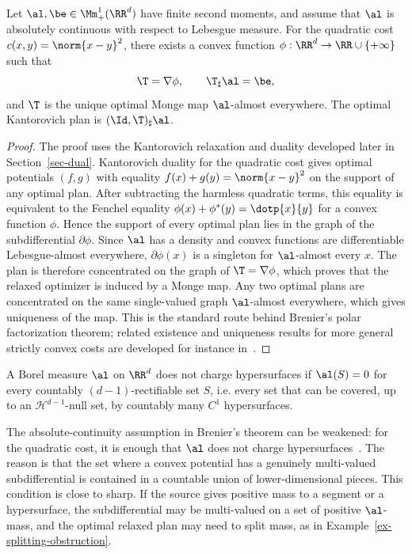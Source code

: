 \begin{thm}[Brenier]\label{thm-brenier}
	Let $\al,\be\in\Mm_+^1(\RR^d)$ have finite second moments, and assume that $\al$ is absolutely continuous with respect to Lebesgue measure. For the quadratic cost $c(x,y)=\norm{x-y}^2$, there exists a convex function $\phi:\RR^d\to\RR\cup\{+\infty\}$ such that
	\[
		\T=\nabla\phi,
		\qquad
		\T_\sharp\al=\be,
	\]
	and $\T$ is the unique optimal Monge map $\al$-almost everywhere. The optimal Kantorovich plan is $(\Id,\T)_\sharp\al$.
\end{thm}
\begin{proof}
	The proof uses the Kantorovich relaxation and duality developed later in Section~\ref{sec-dual}. Kantorovich duality for the quadratic cost gives optimal potentials $(f,g)$ with equality $f(x)+g(y)=\norm{x-y}^2$ on the support of any optimal plan. After subtracting the harmless quadratic terms, this equality is equivalent to the Fenchel equality $\phi(x)+\phi^*(y)=\dotp{x}{y}$ for a convex function $\phi$. Hence the support of every optimal plan lies in the graph of the subdifferential $\partial\phi$. Since $\al$ has a density and convex functions are differentiable Lebesgue-almost everywhere, $\partial\phi(x)$ is a singleton for $\al$-almost every $x$. The plan is therefore concentrated on the graph of $\T=\nabla\phi$, which proves that the relaxed optimizer is induced by a Monge map. Any two optimal plans are concentrated on the same single-valued graph $\al$-almost everywhere, which gives uniqueness of the map. This is the standard route behind Brenier's polar factorization theorem; related existence and uniqueness results for more general strictly convex costs are developed for instance in~\cite{gangbo1996geometry,caffarelli2002constructing,Villani09}.
\end{proof}

\begin{defn}\label{defn-not-charging-hypersurfaces}
	A Borel measure $\al$ on $\RR^d$ does not charge hypersurfaces if $\al(S)=0$ for every countably $(d-1)$-rectifiable set $S$, i.e. every set that can be covered, up to an $\mathcal H^{d-1}$-null set, by countably many $C^1$ hypersurfaces.
\end{defn}

\begin{rem}
	The absolute-continuity assumption in Brenier's theorem can be weakened: for the quadratic cost, it is enough that $\al$ does not charge hypersurfaces~\cite{gangbo1996geometry,Villani09,SantambrogioBook}. The reason is that the set where a convex potential has a genuinely multi-valued subdifferential is contained in a countable union of lower-dimensional pieces. This condition is close to sharp. If the source gives positive mass to a segment or a hypersurface, the subdifferential may be multi-valued on a set of positive $\al$-mass, and the optimal relaxed plan may need to split mass, as in Example~\ref{ex-splitting-obstruction}.
\end{rem}

